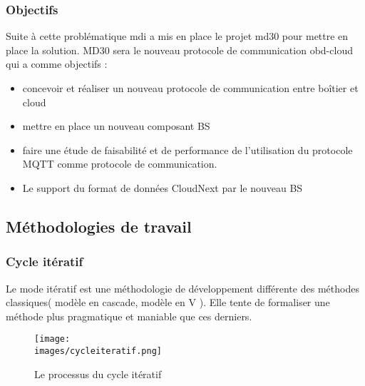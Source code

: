         \subsubsection{Objectifs}
           Suite à cette problématique \gls{mdi} a mis en place le projet \gls{md30} pour mettre en place la solution.
           MD30 sera le nouveau protocole de communication \gls{obd}-cloud qui a comme objectifs :
            \begin{itemize}
                \renewcommand{\labelitemi}{$\bullet$}
                \item concevoir et réaliser un nouveau protocole de communication entre boîtier et cloud
                \item mettre en place un nouveau composant \gls{BS}
                \item faire une étude de faisabilité et de performance de l'utilisation du protocole MQTT 
                comme protocole de communication.
                \item Le support du format de données CloudNext par le nouveau BS
            \end{itemize} 

    \subsection{Méthodologies de travail}
        \subsubsection{Cycle itératif }
            Le mode itératif est une méthodologie de développement différente des méthodes classiques( modèle en cascade, modèle en V ).
            Elle tente de formaliser une méthode plus pragmatique et maniable que ces derniers. 
            \begin{figure}[ht]
                \centering
                \texttt{[image: \\images/cycleiteratif.png]}
                \caption{Le processus du cycle itératif}
            \end{figure}
           
            \vspace{0.2cm}

